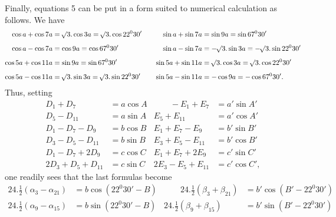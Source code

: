 \clearpage
\begin{landscape}
\begingroup
\fontsize{9.5}{12}\selectfont
{}
\renewcommand{\headrulewidth}{0pt}
\makeatletter\tagsleft@true\let\veqno\@@leqno\makeatother
\setlength{\lineskip}{4pt}\setlength{\lineskiplimit}{4pt}
\newcommand{\VthreeRaisedPoint}{\mathord{\text{\raisebox{.5ex}{.}}}}
\newcommand{\VthreeUpperMark}{\mathord{\text{\makebox[.15em][l]{\kern.25em\raisebox{1.7ex}{\rule{.11em}{.055ex}}}}}}
\newcommand{\VthreeFractionLowPoint}{\mathord{\text{\makebox[0pt][l]{\kern-.25em\raisebox{-.1ex}{\rule{.07em}{.05ex}}}}}}
\par\noindent\hspace*{\parindent}Finally, equations 5 can be put in a form suited to numerical calculation as follows. We have
\[
\begin{aligned}
\cos a+\cos7a&=\BareRoot{3}\mathord{.}\cos3a=\BareRoot{3}\mathord{.}\cos22^0 30'&\qquad\sin a+\sin7a&=\sin9a=\sin67^0 30'\\[4pt]
\cos a-\cos7a&=\cos9a=\cos67^0 30'&\sin a-\sin7a&=-\BareRoot{3}\mathord{.}\sin3a=-\BareRoot{3}\mathord{.}\sin22^0 30'\\[4pt]
\cos5a+\cos11a&=\sin9a=\sin67^0 30'&\sin5a+\sin11a&=\BareRoot{3}\mathord{.}\cos3a=\BareRoot{3}\mathord{.}\cos22^0 30'\\[4pt]
\cos5a-\cos11a&=\BareRoot{3}\mathord{.}\sin3a=\BareRoot{3}\mathord{.}\sin22^0 30'&\sin5a-\sin11a&=-\cos9a=-\cos67^0 30'.
\end{aligned}
\]
Thus, setting
\[
\begin{aligned}
D_1+D_7&=a\cos A&\qquad-E_1+E_7&=a'\sin A'\\
D_5-D_{11}&=a\sin A&E_5+E_{11}&=a'\cos A'\\[6pt]
D_1-D_7-D_9&=b\cos B&E_1+E_7-E_9&=b'\sin B'\\
D_3-D_5-D_{11}&=b\sin B&E_3+E_5-E_{11}&=b'\cos B'\\[6pt]
D_1-D_7+2D_9&=c\cos C&E_1+E_7+2E_9&=c'\sin C'\\
2D_3+D_5+D_{11}&=c\sin C&2E_3-E_5+E_{11}&=c'\cos C',
\end{aligned}
\]
one readily sees that the last formulas become
\[
\tag*{V.}
\begin{aligned}
24\mathord{.}\tfrac12(\alpha_3-\alpha_{21})&=b\cos(22^0 30'-B)&\qquad24\mathord{.}\tfrac12(\beta_3+\beta_{21})&=b'\cos(B'-22^0 30')\\[4pt]
24\mathord{.}\tfrac12(\alpha_9-\alpha_{15})&=b\sin(22^0 30'-B)&24\mathord{.}\tfrac12(\beta_9+\beta_{15})&=b'\sin(B'-22^0 30')\\[6pt]

\end{aligned}\]
\end{landscape}
